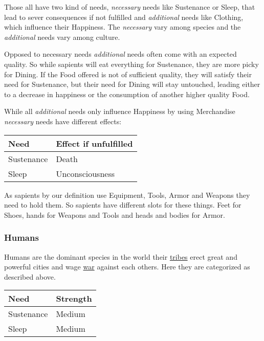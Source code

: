 Those all have two kind of needs, \emph{necessary} needs like \gls{Sustenance}
or \gls{Sleep}, that lead to sever consequences if not fulfilled and
\emph{additional} needs like \gls{Clothing}, which influence their Happiness.
The \emph{necessary} vary among species and the \emph{additional} needs vary
among culture.

Opposed to necessary needs \emph{additional} needs often come with an expected
quality. So while sapients will eat everything for \gls{Sustenance}, they are
more picky for \gls{Dining}. If the \gls{Food} offered is not of sufficient
quality, they will satisfy their need for \gls{Sustenance}, but their need for
\gls{Dining} will stay untouched, leading either to a decrease in happiness or
the consumption of another higher quality \gls{Food}.

While all \emph{additional} needs only influence Happiness by using
\gls{Merchandise} \emph{necessary} needs have different effects:

\begin{longtable}{ll}
	\toprule
	Need             & Effect if unfulfilled \\
	\midrule
	\Gls{Sustenance} & Death                 \\
	\Gls{Sleep}      & Unconsciousness       \\
	\bottomrule
\end{longtable}

As sapients by our definition use \gls{Equipment}, \glspl{Tool}, \gls{Armor}
and \glspl{Weapon} they need to hold them. So sapients have different slots for
these things. Feet for \glspl{Shoe}, hands for \glspl{Weapon} and \glspl{Tool}
and heads and bodies for \gls{Armor}. 

\subsubsection{Humans}\label{ch:World:Inhabitants:Sapients:Humans}

Humans are the dominant species in the world their \hyperref[ch:tribes]{tribes}
erect great and powerful cities and wage \hyperref[ch:Conflict]{war} against
each others. Here they are categorized as described above.

\begin{longtable}{ll}
	\toprule
	Need             & Strength \\
	\midrule
	\Gls{Sustenance} & Medium   \\
	\Gls{Sleep}      & Medium   \\
	\bottomrule
\end{longtable}

